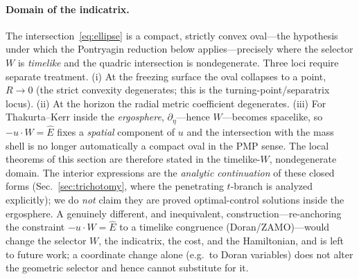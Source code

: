 \documentclass[12pt]{iopart}
\newcommand{\Ehat}{\hat E}
\begin{document}
\paragraph{Domain of the indicatrix.} The intersection~\eqref{eq:ellipse} is a
compact, strictly convex oval---the hypothesis under which the Pontryagin reduction
below applies---precisely where the selector $W$ is \emph{timelike} and the quadric
intersection is nondegenerate. Three loci require separate treatment. (i) At the
freezing surface the oval collapses to a point, $R\to0$ (the strict convexity
degenerates; this is the turning-point/separatrix locus). (ii) At the horizon the
radial metric coefficient degenerates. (iii) For Thakurta--Kerr inside the
\emph{ergosphere}, $\partial_\eta$---hence $W$---becomes spacelike, so
$-u\cdot W=\Ehat$ fixes a \emph{spatial} component of $u$ and the intersection with
the mass shell is no longer automatically a compact oval in the PMP sense. The local
theorems of this section are therefore stated in the timelike-$W$, nondegenerate
domain. The interior expressions are the \emph{analytic continuation} of these
closed forms (Sec.~\ref{sec:trichotomy}, where the penetrating $t$-branch is analyzed
explicitly); we do \emph{not} claim they are proved optimal-control solutions inside
the ergosphere. A genuinely different, and inequivalent, construction---re-anchoring
the constraint $-u\cdot W=\Ehat$ to a timelike congruence (Doran/ZAMO)---would change
the selector $W$, the indicatrix, the cost, and the Hamiltonian, and is left to
future work; a coordinate change alone (e.g.\ to Doran variables) does not alter the
geometric selector and hence cannot substitute for it.
\end{document}
